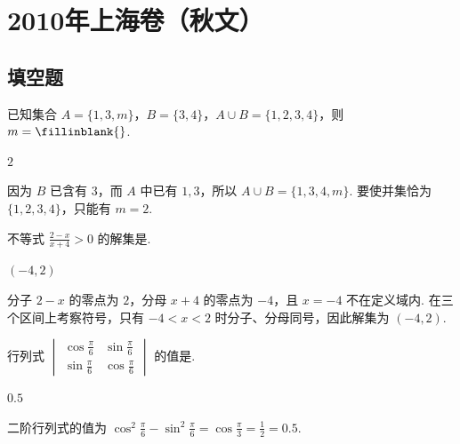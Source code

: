 \chapter{2010年上海卷（秋文）}

\section{填空题}

\begin{problem}
已知集合 \(A = \{1, 3, m\}\)，\(B = \{3, 4\}\)，\(A \cup B = \{1, 2, 3, 4\}\)，则 \(m =\fillinblank{}\).
\end{problem}

\begin{answer}
\(2\)
\end{answer}

\begin{solution}
因为 \(B\) 已含有 \(3\)，而 \(A\) 中已有 \(1,3\)，所以 \(A\cup B=\{1,3,4,m\}\). 要使并集恰为 \(\{1,2,3,4\}\)，只能有 \(m=2\).
\end{solution}

\begin{problem}
不等式 \(\frac{2 - x}{x + 4} > 0\) 的解集是\fillinblank{}.
\end{problem}

\begin{answer}
\((-4,2)\)
\end{answer}

\begin{solution}
分子 \(2-x\) 的零点为 \(2\)，分母 \(x+4\) 的零点为 \(-4\)，且 \(x=-4\) 不在定义域内. 在三个区间上考察符号，只有 \(-4<x<2\) 时分子、分母同号，因此解集为 \((-4,2)\).
\end{solution}

\begin{problem}
行列式 \(\begin{vmatrix} \cos \frac{\pi}{6} & \sin \frac{\pi}{6} \\ \sin \frac{\pi}{6} & \cos \frac{\pi}{6} \end{vmatrix}\) 的值是\fillinblank{}.
\end{problem}

\begin{answer}
\(0.5\)
\end{answer}

\begin{solution}
二阶行列式的值为
\(\cos ^2\frac{\pi}{6}-\sin ^2\frac{\pi}{6}=\cos\frac{\pi}{3}=\frac{1}{2}=0.5\).
\end{solution}

